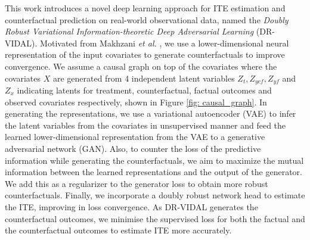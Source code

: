 \documentclass{amia}
\begin{document}
This work introduces a novel deep learning approach for ITE estimation and counterfactual prediction on real-world observational data, named the \emph{Doubly Robust Variational Information-theoretic Deep Adversarial Learning} (DR-VIDAL). 
Motivated from Makhzani \emph{et al.}  \cite{makhzani2015adversarial}, we use a lower-dimensional neural representation of the input covariates to generate counterfactuals to improve convergence. We assume a causal graph on top of the covariates where the covariates $X$ are generated from 4 independent latent variables $Z_t, Z_{ycf}, Z_{yf}$ and $Z_x$ indicating latents for treatment, counterfactual, factual outcomes and observed covariates respectively, shown in Figure \ref{fig: causal_graph}. In generating the representations, we use a variational autoencoder (VAE) to infer the latent variables from the covariates in unsupervised manner and feed the learned lower-dimensional representation from the VAE to a generative adversarial network (GAN). Also, to counter the loss of the predictive information while generating the counterfactuals, we aim to maximize the mutual information between the learned representations and the output of the generator. We add this as a regularizer to the generator loss to obtain more robust counterfactuals. Finally, we incorporate a doubly robust network head to estimate the ITE, improving in loss convergence. As DR-VIDAL generates the counterfactual outcomes, we minimise the supervised loss for both the factual and the counterfactual outcomes to estimate ITE more accurately.
\end{document}

